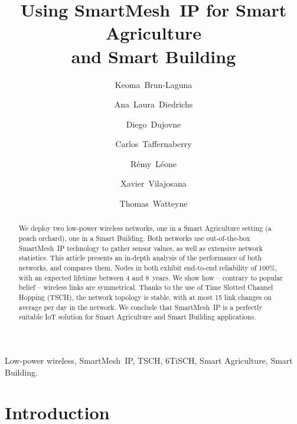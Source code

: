 \documentclass{elsarticle}
\newcommand{\smip}                {SmartMesh~IP\xspace}
\newcommand{\building}            {Smart Building\xspace}
\newcommand{\agri}                {Smart Agriculture\xspace}
\begin{document}
\begin{frontmatter}

\date{}

\title{Using \smip for \agri \\ and \building}

\author[inria]{Keoma~Brun-Laguna}
\author[utn,conicet]{Ana~Laura~Diedrichs}
\author[udp]{Diego~Dujovne}
\author[utn]{Carlos~Taffernaberry}
\author[inria]{R\'emy~L\'eone}
\author[uoc]{Xavier~Vilajosana}
\author[inria]{Thomas~Watteyne}

\address[inria]{~Inria, EVA team, Paris, France}
\address[utn]{~Universidad Tecnol\'ogica Nacional (UTN), Mendoza, Argentina}
\address[udp]{~Universidad Diego Portales, Santiago, Chile}
\address[uoc]{~Universitat Oberta de Catalunya, Barcelona, Catalonia, Spain}
\address[conicet]{~CONICET, Mendoza, Argentina}

\begin{abstract}
We deploy two low-power wireless networks, one in a \agri setting (a peach orchard), one in a \building.
Both networks use out-of-the-box \smip technology to gather sensor values, as well as extensive network statistics.
This article presents an in-depth analysis of the performance of both networks, and compares them.
Nodes in both exhibit end-to-end reliability of 100\%, with an expected lifetime between 4 and 8~years.
We show how -- contrary to popular belief -- wireless links are symmetrical.
Thanks to the use of Time Slotted Channel Hopping (TSCH), the network topology is stable, with at most 15 link changes on average per day in the network.
We conclude that \smip is a perfectly suitable IoT solution for \agri and \building applications.
\end{abstract}

\begin{keyword}
Low-power wireless, \smip, TSCH, 6TiSCH, \agri, \building.
\end{keyword}

\end{frontmatter}

\section{Introduction}
\label{sec:intro}
\end{document}
